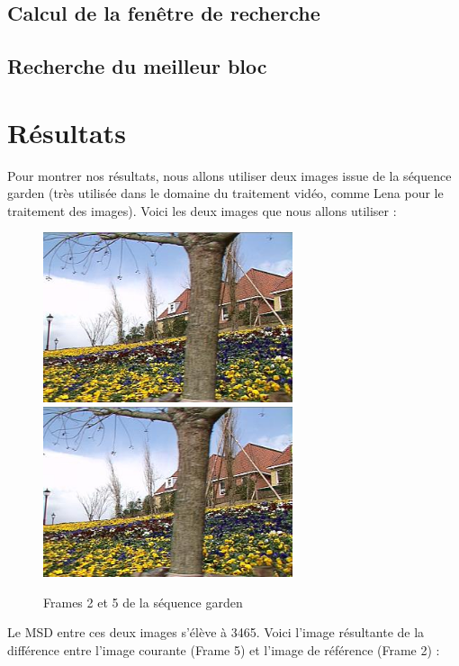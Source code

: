 \documentclass[a4paper, 12pt]{article}
\begin{document}
\subsection{Calcul de la fenêtre de recherche}

\subsection{Recherche du meilleur bloc}

\newpage
\section{Résultats}

Pour montrer nos résultats, nous allons utiliser deux images issue de la séquence garden (très utilisée dans le domaine du traitement vidéo, comme Lena pour le traitement des images). Voici les deux images que nous allons utiliser : 

\begin{figure}[H]
	\centering
	\includegraphics[height=5cm]{../garden1.jpg}
	\includegraphics[height=5cm]{../garden2.jpg}
	\caption{Frames 2 et 5 de la séquence garden}
	\label{fig:garden}
\end{figure}

Le MSD entre ces deux images s'élève à 3465. Voici l'image résultante de la différence entre l'image courante (Frame 5) et l'image de référence (Frame 2) :
\end{document}
